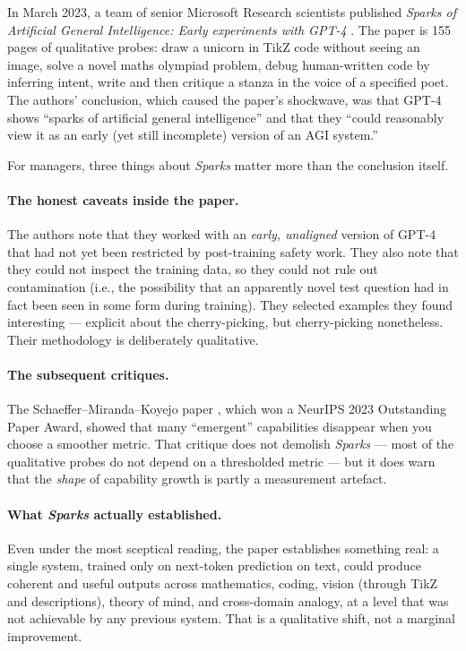 \documentclass[11pt,a4paper]{article}
\begin{document}
In March 2023, a team of senior Microsoft Research scientists
published \emph{Sparks of Artificial General Intelligence: Early
experiments with GPT-4} \citep{bubeck2023sparks}. The paper is 155
pages of qualitative probes: draw a unicorn in TikZ code without seeing
an image, solve a novel maths olympiad problem, debug human-written
code by inferring intent, write and then critique a stanza in the
voice of a specified poet. The authors' conclusion, which caused the
paper's shockwave, was that GPT-4 shows ``sparks of artificial general
intelligence'' and that they ``could reasonably view it as an early
(yet still incomplete) version of an AGI system.''

For managers, three things about \emph{Sparks} matter more than the
conclusion itself.

\paragraph{The honest caveats inside the paper.} The authors note that
they worked with an \emph{early, unaligned} version of GPT-4 that had
not yet been restricted by post-training safety work. They also note
that they could not inspect the training data, so they could not rule
out contamination (i.e., the possibility that an apparently novel test
question had in fact been seen in some form during training). They
selected examples they found interesting --- explicit about the
cherry-picking, but cherry-picking nonetheless. Their methodology is
deliberately qualitative.

\paragraph{The subsequent critiques.} The Schaeffer--Miranda--Koyejo
paper \citep{schaeffer2023mirage}, which won a NeurIPS 2023 Outstanding
Paper Award, showed that many ``emergent'' capabilities disappear when
you choose a smoother metric. That critique does not demolish
\emph{Sparks} --- most of the qualitative probes do not depend on a
thresholded metric --- but it does warn that the \emph{shape} of
capability growth is partly a measurement artefact.

\paragraph{What \emph{Sparks} actually established.} Even under the
most sceptical reading, the paper establishes something real: a single
system, trained only on next-token prediction on text, could produce
coherent and useful outputs across mathematics, coding, vision
(through TikZ and descriptions), theory of mind, and cross-domain
analogy, at a level that was not achievable by any previous system.
That is a qualitative shift, not a marginal improvement.
\end{document}
